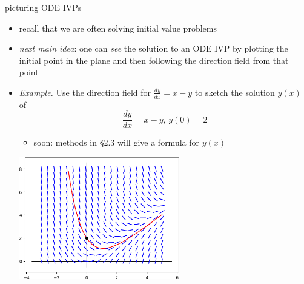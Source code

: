 \documentclass[colorlinks]{beamer}
\begin{document}
\begin{frame}{picturing ODE IVPs}

\begin{itemize}
\item recall that we are often solving initial value problems
\item \emph{next main idea}:  one can \emph{see} the solution to an ODE IVP by plotting the initial point in the plane and then following the direction field from that point

\bigskip
\item \begin{minipage}[t]{0.32\textwidth} \small
\emph{Example.}  Use the direction field for
$\frac{dy}{dx} = x-y$ to sketch the solution $y(x)$ of
    $$\frac{dy}{dx} = x-y, \, y(0)=2$$

    \begin{itemize}
    \item soon: methods in \S 2.3 will give a formula for $y(x)$
    \end{itemize}
\end{minipage}

\vspace{-45mm}
\hfill \includegraphics[width=0.55\textwidth]{figs/example-field-solution}
\end{itemize}
\end{frame}
\end{document}
